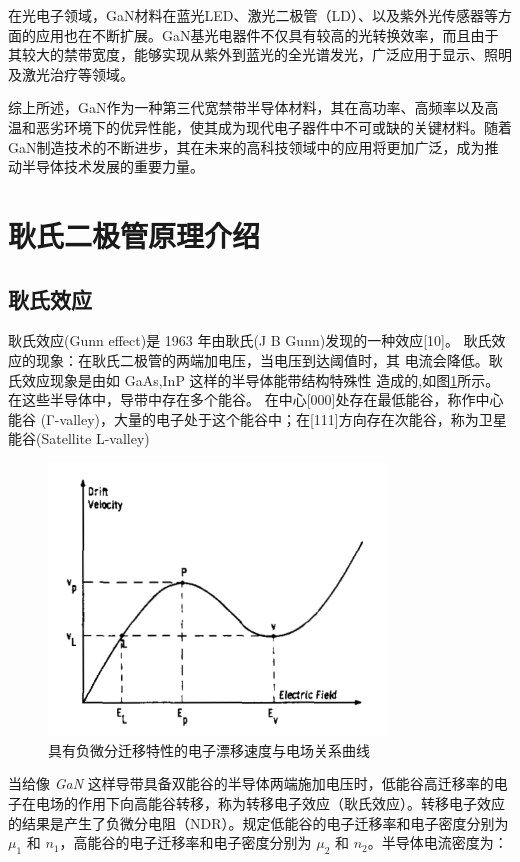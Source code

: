 \documentclass[12pt,hyperref,a4paper,UTF8]{ctexart}
\begin{document}
在光电子领域，GaN材料在蓝光LED、激光二极管（LD）、以及紫外光传感器等方面的应用也在不断扩展。GaN基光电器件不仅具有较高的光转换效率，而且由于其较大的禁带宽度，能够实现从紫外到蓝光的全光谱发光，广泛应用于显示、照明及激光治疗等领域。

综上所述，GaN作为一种第三代宽禁带半导体材料，其在高功率、高频率以及高温和恶劣环境下的优异性能，使其成为现代电子器件中不可或缺的关键材料。随着GaN制造技术的不断进步，其在未来的高科技领域中的应用将更加广泛，成为推动半导体技术发展的重要力量。
\newpage

\section{耿氏二极管原理介绍}
\subsection{耿氏效应}

耿氏效应(Gunn effect)是 1963 年由耿氏(J B Gunn)发现的一种效应[10]。
耿氏效应的现象：在耿氏二极管的两端加电压，当电压到达阈值时，其
电流会降低。耿氏效应现象是由如 GaAs,InP 这样的半导体能带结构特殊性
造成的,如图\ref{fig:Gunn_effect}所示。在这些半导体中，导带中存在多个能谷。
在中心[000]处存在最低能谷，称作中心能谷
(Γ-valley)，大量的电子处于这个能谷中；在[111]方向存在次能谷，称为卫星
能谷(Satellite L-valley)

\begin{figure}[H]
\centering
\includegraphics[width=0.8\textwidth]{figures/fig/image3.png}
\caption{具有负微分迁移特性的电子漂移速度与电场关系曲线\cite{kroemer1964theory}} 
\label{fig:Gunn_effect}
\end{figure}

当给像 \textit{GaN} 这样导带具备双能谷的半导体两端施加电压时，低能谷高迁移率的电子在电场的作用下向高能谷转移，称为转移电子效应（耿氏效应）。转移电子效应的结果是产生了负微分电阻（NDR）。规定低能谷的电子迁移率和电子密度分别为 $\mu_1$ 和 $n_1$，高能谷的电子迁移率和电子密度分别为 $\mu_2$ 和 $n_2$。半导体电流密度为：
\end{document}
